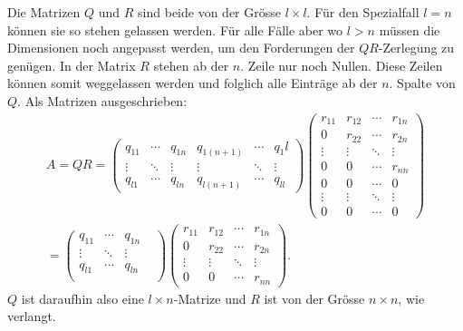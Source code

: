 Die Matrizen $Q$ und $R$ sind beide von der Grösse $l\times l$.
Für den Spezialfall $l=n$ können sie so stehen gelassen werden.
Für alle Fälle aber wo $l>n$ müssen die Dimensionen noch angepasst werden, um den Forderungen der $QR$-Zerlegung zu genügen.
In der Matrix $R$ stehen ab der $n.$ Zeile nur noch Nullen.
Diese Zeilen können somit weggelassen werden und folglich alle Einträge ab der $n.$ Spalte von $Q$.
Als Matrizen ausgeschrieben:
\begin{multline*}
A=QR=
\begin{pmatrix}
q_{11}&\cdots&q_{1n}&q_{1(n+1)}&\cdots&q_1l\\
\vdots&\ddots&\vdots&\vdots    &\ddots&\vdots\\
q_{l1}&\cdots&q_{ln}&q_{l(n+1)}&\cdots&q_{ll}
\end{pmatrix}
\begin{pmatrix}
r_{11}&r_{12}&\cdots&r_{1n}\\
0     &r_{22}&\cdots&r_{2n}\\
\vdots&\vdots&\ddots&\vdots\\
0     &0     &\cdots&r_{nn}\\
0     &0     &\cdots&0\\
\vdots&\vdots&\ddots&\vdots\\
0     &0     &\cdots&0
\end{pmatrix}\\=
\begin{pmatrix}
q_{11}&\cdots&q_{1n}&\\
\vdots&\ddots&\vdots&\\
q_{l1}&\cdots&q_{ln}\\
\end{pmatrix}
\begin{pmatrix}
r_{11}&r_{12}&\cdots&r_{1n}\\
0     &r_{22}&\cdots&r_{2n}\\
\vdots&\vdots&\ddots&\vdots\\
0     &0     &\cdots&r_{nn}
\end{pmatrix}.
\end{multline*}
$Q$ ist daraufhin also eine $l\times n$-Matrize und $R$ ist von der Grösse $n\times n$, wie verlangt.

